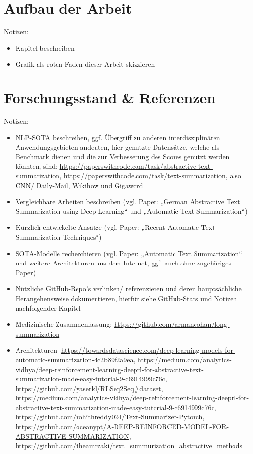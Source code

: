 \section{Aufbau der Arbeit}
Notizen:
\begin{itemize}
	\item Kapitel beschreiben
	\item Grafik als roten Faden dieser Arbeit skizzieren
\end{itemize}


\section{Forschungsstand \& Referenzen}
Notizen:
\begin{itemize}
	\item NLP-SOTA beschreiben, ggf. Übergriff zu anderen interdisziplinären Anwendungsgebieten andeuten, hier genutzte Datensätze, welche als Benchmark dienen und die zur Verbesserung des Scores genutzt werden könnten, sind: \url{https://paperswithcode.com/task/abstractive-text-summarization}, \url{https://paperswithcode.com/task/text-summarization}, also CNN/ Daily-Mail, Wikihow und Gigaword
	\item Vergleichbare Arbeiten beschreiben (vgl. Paper: „German Abstractive Text Summarization using Deep Learning“ und „Automatic Text Summarization“)
	\item Kürzlich entwickelte Ansätze (vgl. Paper: „Recent Automatic Text Summarization Techniques“)
	\item SOTA-Modelle recherchieren (vgl. Paper: „Automatic Text Summarization“ und weitere Architekturen aus dem Internet, ggf. auch ohne zugehöriges Paper)
	\item Nützliche GitHub-Repo's verlinken/ referenzieren und deren hauptsächliche Herangehensweise dokumentieren, hierfür siehe GitHub-Stars und Notizen nachfolgender Kapitel
	\item Medizinische Zusammenfassung: \url{https://github.com/armancohan/long-summarization}
	\item Architekturen: \url{https://towardsdatascience.com/deep-learning-models-for-automatic-summarization-4c2b89f2a9ea}, \url{https://medium.com/analytics-vidhya/deep-reinforcement-learning-deeprl-for-abstractive-text-summarization-made-easy-tutorial-9-c6914999c76c}, \url{https://github.com/yaserkl/RLSeq2Seq#dataset}, \url{https://medium.com/analytics-vidhya/deep-reinforcement-learning-deeprl-for-abstractive-text-summarization-made-easy-tutorial-9-c6914999c76c}, \url{https://github.com/rohithreddy024/Text-Summarizer-Pytorch}, \url{https://github.com/oceanypt/A-DEEP-REINFORCED-MODEL-FOR-ABSTRACTIVE-SUMMARIZATION}, \url{https://github.com/theamrzaki/text_summurization_abstractive_methods}

\end{itemize}
